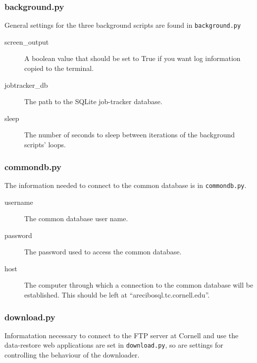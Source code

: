 \documentclass[12pt]{article}
\begin{document}
\subsubsection{background.py}
General settings for the three background scripts are found in \texttt{background.py}

\begin{description}
    \item[screen\_output] A boolean value that should be set to True if you want log information copied to the terminal.
    \item[jobtracker\_db] The path to the SQLite job-tracker database.
    \item[sleep] The number of seconds to sleep between iterations of the background scripts' loops.
\end{description}


\subsubsection{commondb.py}
The information needed to connect to the common database is in \texttt{commondb.py}.

\begin{description}
    \item[username] The common database user name.
    \item[password] The password used to access the common database.
    \item[host] The computer through which a connection to the common database will be established. This should be left at ``arecibosql.tc.cornell.edu''.
\end{description}


\subsubsection{download.py}
Informatation necessary to connect to the FTP server at Cornell and use the data-restore web applications are set in \texttt{download.py}, so are settings for controlling the behaviour of the downloader.
\end{document}
